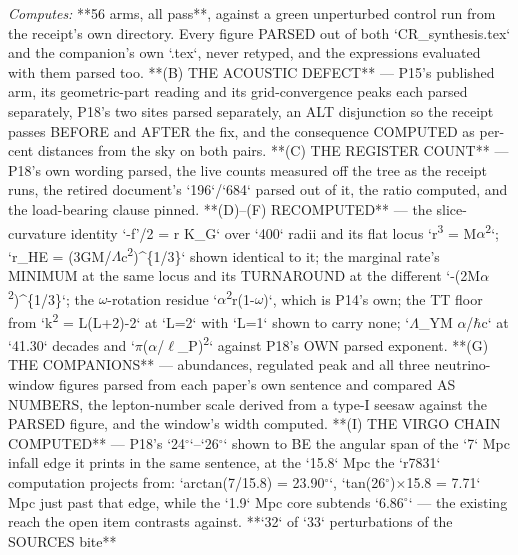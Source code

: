 \begin{description}
\emph{Computes:} **56 arms, all pass**, against a green unperturbed control run from the receipt's own directory. Every figure PARSED out of both `CR\_synthesis.tex` and the companion's own `.tex`, never retyped, and the expressions evaluated with them parsed too. **(B) THE ACOUSTIC DEFECT** --- P15's published arm, its geometric-part reading and its grid-convergence peaks each parsed separately, P18's two sites parsed separately, an ALT disjunction so the receipt passes BEFORE and AFTER the fix, and the consequence COMPUTED as per-cent distances from the sky on both pairs. **(C) THE REGISTER COUNT** --- P18's own wording parsed, the live counts measured off the tree as the receipt runs, the retired document's `196`/`684` parsed out of it, the ratio computed, and the load-bearing clause pinned. **(D)--(F) RECOMPUTED** --- the slice-curvature identity `-f'/2 = r K\_G` over `400` radii and its flat locus `r\textsuperscript{3} = M\ensuremath{\alpha}\textsuperscript{2}`; `r\_HE = (3GM/\ensuremath{\Lambda}c\textsuperscript{2})\textasciicircum{}\{1/3\}` shown identical to it; the marginal rate's MINIMUM at the same locus and its TURNAROUND at the different `-(2M\ensuremath{\alpha}\textsuperscript{2})\textasciicircum{}\{1/3\}`; the \ensuremath{\omega}-rotation residue `\ensuremath{\alpha}\textsuperscript{2}r(1-\ensuremath{\omega})`, which is P14's own; the TT floor from `k\textsuperscript{2} = L(L+2)-2` at `L=2` with `L=1` shown to carry none; `\ensuremath{\Lambda}\_YM \ensuremath{\alpha}/\ensuremath{\hbar}c` at `41.30` decades and `\ensuremath{\pi}(\ensuremath{\alpha}/\ensuremath{\ell}\_P)\textsuperscript{2}` against P18's OWN parsed exponent. **(G) THE COMPANIONS** --- abundances, regulated peak and all three neutrino-window figures parsed from each paper's own sentence and compared AS NUMBERS, the lepton-number scale derived from a type-I seesaw against the PARSED figure, and the window's width computed. **(I) THE VIRGO CHAIN COMPUTED** --- P18's `24\ensuremath{^\circ}`--`26\ensuremath{^\circ}` shown to BE the angular span of the `7` Mpc infall edge it prints in the same sentence, at the `15.8` Mpc the `r7831` computation projects from: `arctan(7/15.8) = 23.90\ensuremath{^\circ}`, `tan(26\ensuremath{^\circ})\ensuremath{\times}15.8 = 7.71` Mpc just past that edge, while the `1.9` Mpc core subtends `6.86\ensuremath{^\circ}` --- the existing reach the open item contrasts against. **`32` of `33` perturbations of the SOURCES bite**

\end{description}
